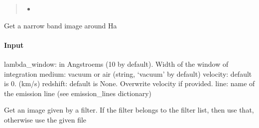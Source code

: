 \documentclass[letterpaper,10pt,english]{sphinxmanual}
\begin{document}
\begin{fulllineitems}
\begin{fulllineitems}
\begin{quote}
\begin{description}
\begin{itemize}
\item {} 
\sphinxAtStartPar
{}

\end{itemize}


\end{description}\end{quote}

\end{fulllineitems}


\begin{fulllineitems}
\label{\detokenize{api/pymusepipe:pymusepipe.mpdaf_pipe.MuseCube.get_emissionline_image}}
\pysigstartsignatures
{}
\pysigstopsignatures
\sphinxAtStartPar
Get a narrow band image around Ha


\paragraph{Input}
\label{\detokenize{api/pymusepipe:id90}}
\sphinxAtStartPar
lambda\_window: in Angstroems (10 by default). Width of the window of integration
medium: vacuum or air (string, ‘vacuum’ by default)
velocity: default is 0. (km/s)
redshift: default is None. Overwrite velocity if provided.
line: name of the emission line (see emission\_lines dictionary)

\end{fulllineitems}


\begin{fulllineitems}
\label{\detokenize{api/pymusepipe:pymusepipe.mpdaf_pipe.MuseCube.get_filter_image}}
\pysigstartsignatures
{}
\pysigstopsignatures
\sphinxAtStartPar
Get an image given by a filter. If the filter belongs to
the filter list, then use that, otherwise use the given file


\end{fulllineitems}
\end{fulllineitems}
\end{document}
